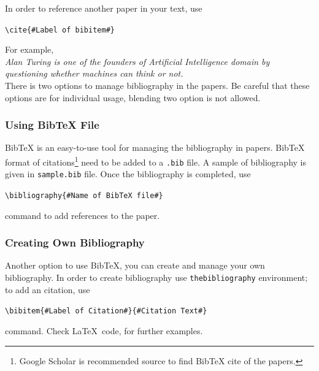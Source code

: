 \documentclass[a4paper,12pt]{article}
\newcommand{\writecommand}[2]{
    \begin{center}
        \texttt{\textbackslash #1\{\##2\#\}} \\
    \end{center}
}
\begin{document}
In order to reference another paper in your text, use \writecommand{cite}{Label of bibitem} For example, 
\\[1\baselineskip]
\indent\textit{Alan Turing is one of the founders of Artificial Intelligence domain by questioning whether machines can think or not.\cite{turing2009computing}} \\[1\baselineskip] 
There is two options to manage bibliography in the papers. Be careful that these options are for individual usage, blending two option is not allowed. 

\subsubsection{Using BibTeX File}
BibTeX is an easy-to-use tool for managing the bibliography in papers. BibTeX format of citations\footnote{Google Scholar is recommended source to find BibTeX cite of the papers.} need to be added to a \texttt{.bib} file. A sample of bibliography is given in \texttt{sample.bib} file. Once the bibliography is completed, use \writecommand{bibliography}{Name of BibTeX file} command to add references to the paper.

\subsubsection{Creating Own Bibliography}
Another option to use BibTeX, you can create and manage your own bibliography. In order to create bibliography use \texttt{thebibliography} environment; to add an citation, use
\begin{center}
    \texttt{\textbackslash bibitem\{\#Label of Citation\#\}\{\#Citation Text\#\}} \\
\end{center}
command. Check \LaTeX~code, for further examples. 



%
%
\clearpage


%
%


%
%

\end{document}
